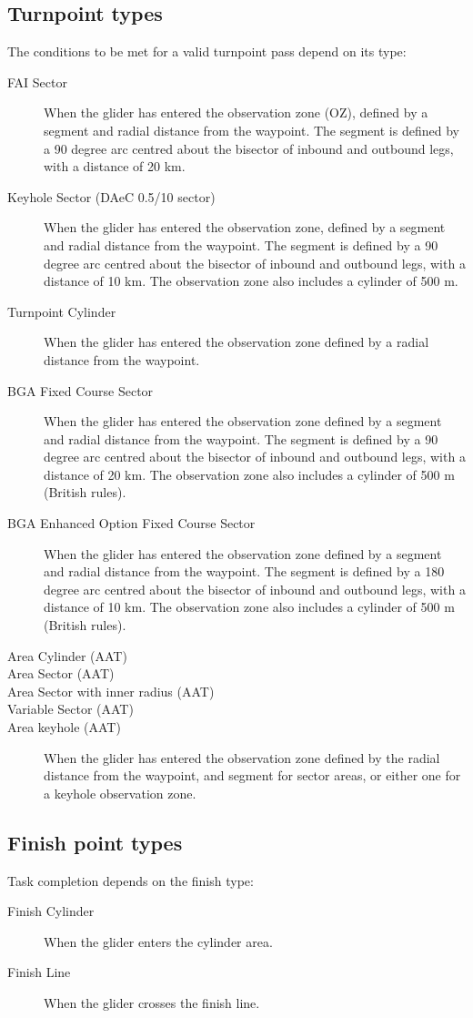 \subsection*{Turnpoint types}
The conditions to be met for a valid turnpoint pass depend on its
 type:
\begin{description}
\item[FAI Sector] When the glider has entered the observation zone (OZ), defined
by a segment and radial distance from the waypoint.  The segment is
defined by a 90 degree arc centred about the bisector of inbound and
outbound legs, with a distance of 20 km.
\item[Keyhole Sector (DAeC 0.5/10 sector)] When the glider has entered the
observation zone, defined by a segment and radial distance from the waypoint.  The segment is
defined by a 90 degree arc centred about the bisector of inbound and
outbound legs, with a distance of 10 km.  The observation zone also includes
a cylinder of 500 m.
\item[Turnpoint Cylinder]  When the glider has entered the observation zone
defined by a radial distance from the waypoint.
\item[BGA Fixed Course Sector]  When the glider has entered the
observation zone defined by a segment and radial distance from the
waypoint. The segment is defined by a 90 degree arc centred about the
bisector of inbound and outbound legs, with a distance of 20 km.
The observation zone also includes a cylinder of 500 m (British rules).
\item[BGA Enhanced Option Fixed Course Sector]  When the glider has entered the
observation zone defined by a segment and radial distance from the
waypoint. The segment is defined by a 180 degree arc centred about the
bisector of inbound and outbound legs, with a distance of 10 km.
The observation zone also includes a cylinder of 500 m (British rules).
\item[Area Cylinder (AAT)]
\item[Area Sector (AAT)]
\item[Area Sector with inner radius (AAT)]
\item[Variable Sector (AAT)]
\item[Area keyhole (AAT)]
When the glider has entered the observation zone defined by the radial distance from the waypoint, and segment for sector areas, or either one for a keyhole observation zone.
\end{description}

\subsection*{Finish point types}
Task completion depends on the finish type:
\begin{description}
\item[Finish Cylinder] When the glider enters the cylinder area.
\item[Finish Line] When the glider crosses the finish line.
\end{description}

